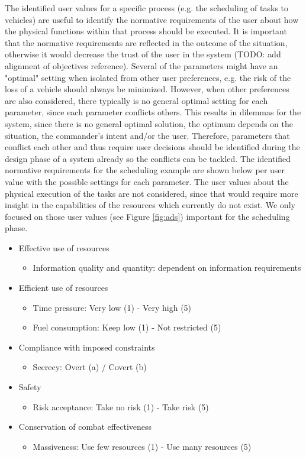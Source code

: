 \documentclass[twoside,twocolumn]{article}
\begin{document}
%
%
The identified user values for a specific process (e.g. the scheduling of tasks to vehicles) are useful to identify the normative requirements of the user about how the physical functions within that process should be executed. It is important that the normative requirements are reflected in the outcome of the situation, otherwise it would decrease the trust of the user in the system (TODO: add alignment of objectives reference). Several of the parameters might have an "optimal" setting when isolated from other user preferences, e.g. the risk of the loss of a vehicle should always be minimized. However, when other preferences are also considered, there typically is no general optimal setting for each parameter, since each parameter conflicts others. This results in dilemmas for the system, since there is no general optimal solution, the optimum depends on the situation, the commander's intent and/or the user. Therefore, parameters that conflict each other and thus require user decisions should be identified during the design phase of a system already so the conflicts can be tackled. The identified normative requirements for the scheduling example are shown below per user value with the possible settings for each parameter. The user values about the physical execution of the tasks are not considered, since that would require more insight in the capabilities of the resources which currently do not exist. We only focused on those user values (see Figure \ref{fig:ads}) important for the scheduling phase. 
%
\begin{itemize}
	\item Effective use of resources
		\begin{itemize}
			\item Information quality and quantity: dependent on information requirements
		\end{itemize}
	\item Efficient use of resources
		\begin{itemize}
			\item Time pressure: Very low (1) - Very high (5)
			\item Fuel consumption: Keep low (1) - Not restricted (5)
		\end{itemize}
	\item Compliance with imposed constraints
		\begin{itemize}
			\item Secrecy: Overt (a) / Covert (b)
		\end{itemize}
	\item Safety
		\begin{itemize}
			\item Risk acceptance: Take no risk (1) - Take risk (5)
		\end{itemize}
	\item Conservation of combat effectiveness
		\begin{itemize}
			\item Massiveness: Use few resources (1) - Use many resources (5)
		\end{itemize}
\end{itemize}
\end{document}
